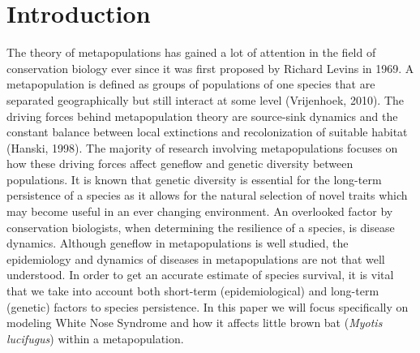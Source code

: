 \documentclass[12pt]{article}
\begin{document}

\section*{\centering \sc \large Introduction}
The theory of metapopulations has gained a lot of attention in the field of conservation biology ever since it was first proposed by Richard Levins in 1969. A metapopulation is defined as groups of populations of one species that are separated geographically but still interact at some level (Vrijenhoek, 2010). The driving forces behind metapopulation theory are source-sink dynamics and the constant balance between local extinctions and recolonization of suitable habitat (Hanski, 1998). The majority of research involving metapopulations focuses on how these driving forces affect geneflow and genetic diversity between populations. It is known that genetic diversity is essential for the long-term persistence of a species as it allows for the natural selection of novel traits which may become useful in an ever changing environment. An overlooked factor by conservation biologists, when determining the resilience of a species, is disease dynamics. Although geneflow in  metapopulations is well studied, the epidemiology and dynamics of diseases in metapopulations are not that well understood.  In order  to get an accurate estimate of species survival, it is vital that we take into account both short-term (epidemiological) and long-term (genetic) factors to species persistence. In this paper we will focus specifically on modeling White Nose Syndrome and how it affects little brown bat (\textit{Myotis lucifugus}) within a metapopulation.
\end{document}
